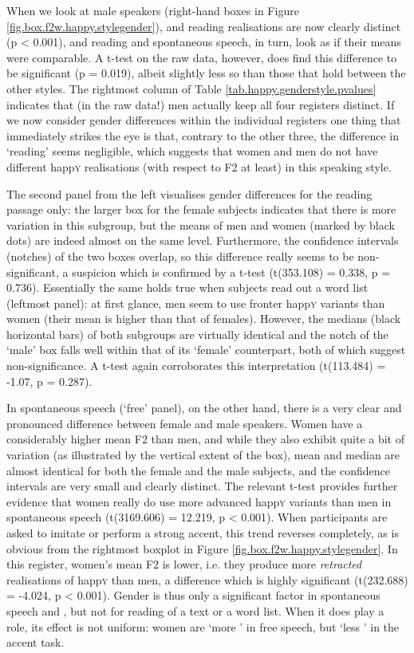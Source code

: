 When we look at male speakers (right-hand boxes in Figure \ref{fig.box.f2w.happy.stylegender}),  and reading realisations are now clearly distinct (p < 0.001), and reading and spontaneous speech, in turn, look as if their means were comparable.
A t-test on the raw data, however, does find this difference to be significant (p = 0.019), albeit slightly less so than those that hold between the other styles.
The rightmost column of Table \ref{tab.happy.genderstyle.pvalues} indicates that (in the raw data!) men actually keep all four registers distinct.
If we now consider gender differences within the individual registers one thing that immediately strikes the eye is that, contrary to the other three, the difference in `reading' seems negligible, which suggests that women and men do not have different happ\textsc{y} realisations (with respect to F2 at least) in this speaking style.

The second panel from the left visualises gender differences for the reading passage only: the larger box for the female subjects indicates that there is more variation in this subgroup, but the means of men and women (marked by black dots) are indeed almost on the same level.
Furthermore, the confidence intervals (notches) of the two boxes overlap, so this difference really seems to be non-significant, a suspicion which is confirmed by a t-test (t(353.108) = 0.338, p = 0.736).
Essentially the same holds true when subjects read out a word list (leftmost panel): at first glance, men seem to use fronter happ\textsc{y} variants than women (their mean is higher than that of females).
However, the medians (black horizontal bars) of both subgroups are virtually identical and the notch of the `male' box falls well within that of its `female' counterpart, both of which suggest non-significance.
A t-test again corroborates this interpretation (t(113.484) = -1.07, p = 0.287).

In spontaneous speech (`free' panel), on the other hand, there is a very clear and pronounced difference between female and male speakers.
Women have a considerably higher mean F2 than men, and while they also exhibit quite a bit of variation (as illustrated by the vertical extent of the box), mean and median are almost identical for both the female and the male subjects, and the confidence intervals are very small and clearly distinct.
The relevant t-test provides further evidence that women really do use more advanced happ\textsc{y} variants than men in spontaneous speech (t(3169.606) = 12.219, p < 0.001).
When participants are asked to imitate or perform a strong  accent, this trend reverses completely, as is obvious from the rightmost boxplot in Figure \ref{fig.box.f2w.happy.stylegender}.
In this register, women's mean F2 is lower, i.e. they produce more \emph{retracted} realisations of happ\textsc{y} than men, a difference which is highly significant (t(232.688) = -4.024, p < 0.001).
Gender is thus only a significant factor in spontaneous speech and , but not for reading of a text or a word list.
When it does play a role, its effect is not uniform: women are `more ' in free speech, but `less ' in the accent  task.

